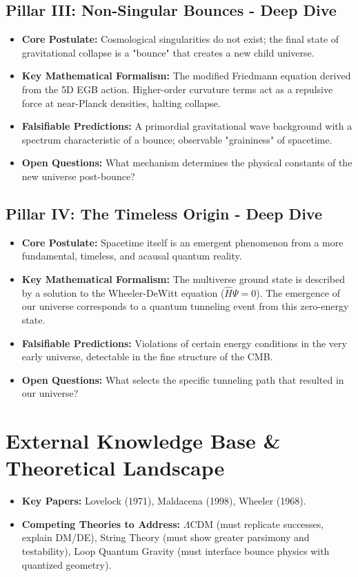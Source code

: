 \documentclass[aps,prd,onecolumn,10pt,superscriptaddress,nofootinbib,floatfix]{revtex4-2}
\begin{document}
\subsection{Pillar III: Non-Singular Bounces - Deep Dive}
\begin{itemize}
    \item \textbf{Core Postulate:} Cosmological singularities do not exist; the final state of gravitational collapse is a "bounce" that creates a new child universe.
    \item \textbf{Key Mathematical Formalism:} The modified Friedmann equation derived from the 5D EGB action. Higher-order curvature terms act as a repulsive force at near-Planck densities, halting collapse.
    \item \textbf{Falsifiable Predictions:} A primordial gravitational wave background with a spectrum characteristic of a bounce; observable "graininess" of spacetime.
    \item \textbf{Open Questions:} What mechanism determines the physical constants of the new universe post-bounce?
\end{itemize}

\subsection{Pillar IV: The Timeless Origin - Deep Dive}
\begin{itemize}
    \item \textbf{Core Postulate:} Spacetime itself is an emergent phenomenon from a more fundamental, timeless, and acausal quantum reality.
    \item \textbf{Key Mathematical Formalism:} The multiverse ground state is described by a solution to the Wheeler-DeWitt equation ($\hat{H}\Psi = 0$). The emergence of our universe corresponds to a quantum tunneling event from this zero-energy state.
    \item \textbf{Falsifiable Predictions:} Violations of certain energy conditions in the very early universe, detectable in the fine structure of the CMB.
    \item \textbf{Open Questions:} What selects the specific tunneling path that resulted in our universe?
\end{itemize}

\section{External Knowledge Base \& Theoretical Landscape}
\begin{itemize}
    \item \textbf{Key Papers:} Lovelock (1971), Maldacena (1998), Wheeler (1968).
    \item \textbf{Competing Theories to Address:} $\Lambda$CDM (must replicate successes, explain DM/DE), String Theory (must show greater parsimony and testability), Loop Quantum Gravity (must interface bounce physics with quantized geometry).
\end{itemize}
\end{document}
